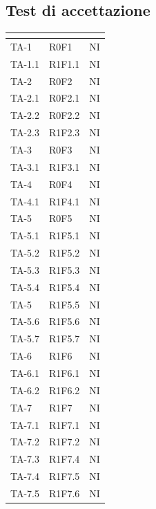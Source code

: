 \subsection{Test di accettazione}
\normalsize
\renewcommand{\arraystretch}{1}
\begin{longtable}{|C{2.5cm}|C{2.5cm}|C{2.5cm}|}
	\hline
	\textbf{\color{title_text}{Test}} & \textbf{\color{title_text}{Requisito}} & \textbf{\color{title_text}{Stato}} \\
	\hline
	\endhead
	{TA-1} & {R0F1} & {NI}\\
	\hline
	{TA-1.1} & {R1F1.1} 
	& {NI}\\
	\hline
	{TA-2} & {R0F2} 
	& {NI}\\
	\hline
	{TA-2.1} & {R0F2.1}
	& {NI}\\
	\hline
	{TA-2.2} & {R0F2.2}
	& {NI}\\
	\hline
	{TA-2.3} & {R1F2.3} 
	& {NI}\\
	\hline
	{TA-3} & {R0F3} 
	& {NI}\\
	\hline
	{TA-3.1} & {R1F3.1}
	& {NI}\\
	\hline
	{TA-4} & {R0F4}
	& {NI}\\
	\hline
	{TA-4.1} & {R1F4.1}
	& {NI}\\
	\hline
	{TA-5} & {R0F5}
	& {NI}\\
	\hline
	{TA-5.1} & {R1F5.1}
	& {NI}\\
	\hline
	{TA-5.2} & {R1F5.2}
	& {NI}\\
	\hline
	{TA-5.3} & {R1F5.3}
	& {NI}\\
	\hline
	{TA-5.4} & {R1F5.4}
	& {NI}\\
	\hline
	{TA-5} & {R1F5.5}
	& {NI}\\
	\hline
	{TA-5.6} & {R1F5.6}
	& {NI}\\
	\hline
	{TA-5.7} & {R1F5.7}
	& {NI}\\
	\hline
	{TA-6} & {R1F6}
	& {NI}\\
	\hline
	{TA-6.1} & {R1F6.1}
	& {NI}\\
	\hline
	{TA-6.2} & {R1F6.2}
	& {NI}\\
	\hline
	{TA-7} & {R1F7}
	& {NI}\\
	\hline
	{TA-7.1} & {R1F7.1}
	& {NI}\\
	\hline
	{TA-7.2} & {R1F7.2}
	& {NI}\\
	\hline
	{TA-7.3} & {R1F7.4}
	& {NI}\\
	\hline
	{TA-7.4} & {R1F7.5}
	& {NI}\\
	\hline
	{TA-7.5} & {R1F7.6}
	& {NI}\\

\end{longtable}
